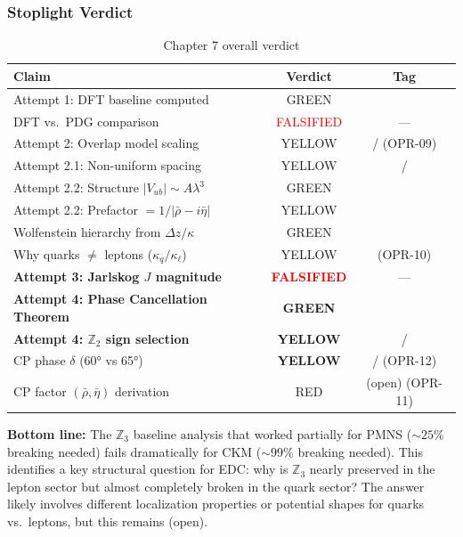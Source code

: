 \subsubsection{Stoplight Verdict}

\begin{table}[ht]
\centering
\caption{Chapter 7 overall verdict}
\label{tab:ch7_verdict}
\begin{tabular}{lcc}
\toprule
\textbf{Claim} & \textbf{Verdict} & \textbf{Tag} \\
\midrule
Attempt 1: DFT baseline computed & GREEN & \tagDc{} \\
DFT vs.\ PDG comparison & \textcolor{red}{FALSIFIED} & --- \\
Attempt 2: Overlap model scaling & YELLOW & \tagDc{}/\tagP{} (OPR-09) \\
Attempt 2.1: Non-uniform spacing & YELLOW & \tagDc{}/\tagCal{} \\
Attempt 2.2: Structure $|V_{ub}| \sim A\lambda^3$ & \textcolor{OliveGreen}{GREEN} & \tagDc{} \\
Attempt 2.2: Prefactor $= 1/|\bar\rho{-}i\bar\eta|$ & YELLOW & \tagI{} \\
Wolfenstein hierarchy from $\Delta z/\kappa$ & \textcolor{OliveGreen}{GREEN} & \tagDc{} \\
Why quarks $\neq$ leptons ($\kappa_q/\kappa_\ell$) & YELLOW & \tagI{} (OPR-10) \\
\textbf{Attempt 3: Jarlskog $J$ magnitude} & \textcolor{red}{\textbf{FALSIFIED}} & --- \\
\textbf{Attempt 4: Phase Cancellation Theorem} & \textcolor{OliveGreen}{\textbf{GREEN}} & \tagDc{} \\
\textbf{Attempt 4: $\mathbb{Z}_2$ sign selection} & \textcolor{YellowOrange}{\textbf{YELLOW}} & \tagDc{}/\tagI{} \\
CP phase $\delta$ (60° vs 65°) & \textcolor{YellowOrange}{\textbf{YELLOW}} & \tagDc{}/\tagI{} (OPR-12) \\
CP factor $(\bar\rho, \bar\eta)$ derivation & RED & (open) (OPR-11) \\
\bottomrule
\end{tabular}
\end{table}

\textbf{Bottom line:} The $\mathbb{Z}_3$ baseline analysis that worked partially
for PMNS ($\sim 25\%$ breaking needed) fails dramatically for CKM ($\sim 99\%$
breaking needed). This identifies a key structural question for EDC: why is
$\mathbb{Z}_3$ nearly preserved in the lepton sector but almost completely
broken in the quark sector? The answer likely involves different localization
properties or potential shapes for quarks vs.\ leptons, but this remains (open).

